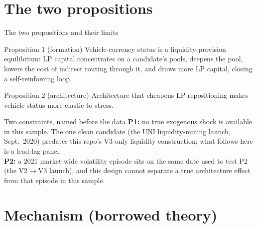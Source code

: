 \documentclass[aspectratio=169]{beamer}
\begin{document}
\section{The two propositions}

\begin{frame}{The two propositions and their limits}
  \begin{block}{Proposition 1 (formation)}
    Vehicle-currency status is a liquidity-provision equilibrium: LP capital concentrates on a candidate's pools, deepens the pool, lowers the cost of indirect routing through it, and draws more LP capital, closing a self-reinforcing loop.
  \end{block}
  \begin{block}{Proposition 2 (architecture)}
    Architecture that cheapens LP repositioning makes vehicle status more elastic to stress.
  \end{block}
  \vspace{0.5em}
  \begin{alertblock}{Two constraints, named before the data}
    \small
    \textbf{P1:} no true exogenous shock is available in this sample. The one clean candidate (the UNI liquidity-mining launch, Sept.\ 2020) predates this repo's V3-only liquidity construction; what follows here is a lead-lag panel.\\
    \textbf{P2:} a 2021 market-wide volatility episode sits on the same date used to test P2 (the V2$\to$V3 launch), and this design cannot separate a true architecture effect from that episode in this sample.
  \end{alertblock}
\end{frame}

\section{Mechanism (borrowed theory)}
\end{document}
